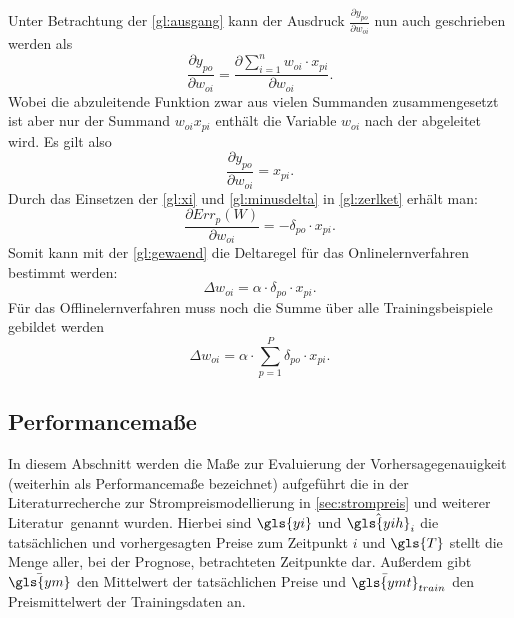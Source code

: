 Unter Betrachtung der \autoref{gl:ausgang} kann der Ausdruck $ \frac{\partial y_{po}}{\partial w_{oi}}$ nun auch geschrieben werden als 
\begin{equation}
\frac{\partial y_{po}}{\partial w_{oi}} = \frac{\partial \sum\limits_{i=1}^n w_{oi} \cdot x_{pi}}{\partial w_{oi}} .
\label{gl:vor_xi}
\end{equation}
Wobei die abzuleitende Funktion zwar aus vielen Summanden zusammengesetzt ist aber nur der Summand $w_{oi} x_{pi}$ enthält die Variable $w_{oi}$ nach der abgeleitet wird. Es gilt also
\begin{equation}
\frac{\partial y_{po}}{\partial w_{oi}} = x_{pi}.
\label{gl:xi}
\end{equation}
Durch das Einsetzen der \autoref{gl:xi} und \autoref{gl:minusdelta} in \autoref{gl:zerlket} erhält man:
\begin{equation}
\frac{\partial Err_p(W)}{\partial w_{oi}}= - \delta_{po} \cdot x_{pi}.
\label{gl:ze}
\end{equation}
Somit kann mit der \autoref{gl:gewaend} die Deltaregel für das Onlinelernverfahren bestimmt werden:
\begin{equation}
\Delta w_{oi} = \alpha \cdot \delta_{po} \cdot x_{pi} .
\label{gl:fertig_delta}
\end{equation}
Für das Offlinelernverfahren muss noch die Summe über alle Trainingsbeispiele gebildet werden
\begin{equation}
\Delta w_{oi} = \alpha \cdot \sum^P_{p=1} \delta_{po} \cdot x_{pi} .
\end{equation}





\newpage
\subsection{Performancemaße}\label{sec:perfmas}
In diesem Abschnitt werden die Maße zur Evaluierung der Vorhersagegenauigkeit (weiterhin als Performancemaße bezeichnet) aufgeführt die in der Literaturrecherche zur Strompreismodellierung in \autoref{sec:strompreis} und weiterer Literatur\, genannt wurden. Hierbei sind $\gls{yi}$ und $\hat{\gls{yih}}_i$ die tatsächlichen und vorhergesagten Preise zum Zeitpunkt $i$ und $\gls{T}$ stellt die Menge aller, bei der Prognose, betrachteten Zeitpunkte dar. Außerdem gibt $\mean{\gls{ym}}$ den Mittelwert der tatsächlichen Preise und $\mean{\gls{ymt}}_{train}$ den Preismittelwert der Trainingsdaten an.

